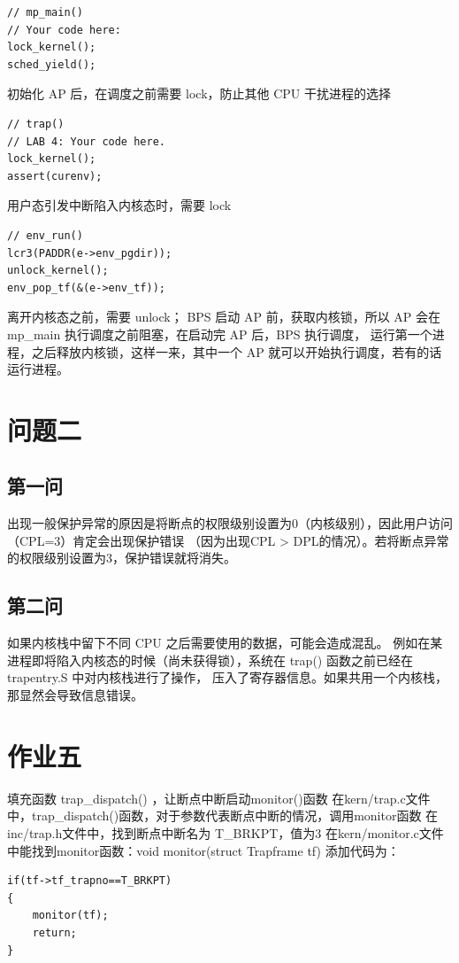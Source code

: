 \documentclass[12pt,a4paper,UTF8]{article}
\begin{document}
    \begin{lstlisting}[style=CPP]
// mp_main()
// Your code here:
lock_kernel();
sched_yield();
    \end{lstlisting}
    初始化 AP 后，在调度之前需要 lock，防止其他 CPU 干扰进程的选择
    
    \begin{lstlisting}[style=CPP]
// trap()
// LAB 4: Your code here.
lock_kernel();
assert(curenv);
    \end{lstlisting}
    用户态引发中断陷入内核态时，需要 lock

    \begin{lstlisting}[style=CPP]
// env_run()
lcr3(PADDR(e->env_pgdir));
unlock_kernel();
env_pop_tf(&(e->env_tf));
    \end{lstlisting}
    离开内核态之前，需要 unlock；
    BPS 启动 AP 前，获取内核锁，所以 AP 会在 mp\_main 执行调度之前阻塞，在启动完 AP 后，BPS 执行调度，
    运行第一个进程，之后释放内核锁，这样一来，其中一个 AP 就可以开始执行调度，若有的话运行进程。

\section{问题二}
    \subsection{第一问}
    出现一般保护异常的原因是将断点的权限级别设置为0（内核级别），因此用户访问（CPL=3）肯定会出现保护错误
    （因为出现CPL > DPL的情况）。若将断点异常的权限级别设置为3，保护错误就将消失。

    \subsection{第二问}
    如果内核栈中留下不同 CPU 之后需要使用的数据，可能会造成混乱。
    例如在某进程即将陷入内核态的时候（尚未获得锁），系统在 trap() 函数之前已经在 trapentry.S 中对内核栈进行了操作，
    压入了寄存器信息。如果共用一个内核栈，那显然会导致信息错误。

\section{作业五}
    填充函数 trap\_dispatch() ，让断点中断启动monitor()函数
    在kern/trap.c文件中，trap\_dispatch()函数，对于参数代表断点中断的情况，调用monitor函数
    在inc/trap.h文件中，找到断点中断名为 T\_BRKPT，值为3
    在kern/monitor.c文件中能找到monitor函数：void monitor(struct Trapframe \*tf)
    添加代码为：
    \begin{lstlisting}[style=CPP]
if(tf->tf_trapno==T_BRKPT)
{
    monitor(tf);
    return;
}
    \end{lstlisting}
\end{document}
